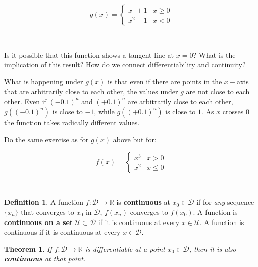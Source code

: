 \documentclass[11pt]{article}
\theoremstyle{definition}
\newtheorem{definition}{Definition}
\theoremstyle{plain}
\newtheorem{theorem}{Theorem}
\begin{document}
\[
g(x) = \begin{cases}
x\phantom{^2}+1 & x \geq 0 \\
x^2-1 & x < 0 
\end{cases}
\]

    \begin{center}
    \end{center}
    { \hspace*{\fill} \\}
    
    Is it possible that this function shows a tangent line at \(x = 0\)?
What is the implication of this result? How do we connect
differentiability and continuity?

What is happening under \(g(x)\) is that even if there are points in the
\(x-\)axis that are arbitrarily close to each other, the values under
\(g\) are not close to each other. Even if \((-0.1)^n\) and \((+0.1)^n\)
are arbitrarily close to each other, \(g\left((-0.1)^n\right)\) is close
to \(-1\), while \(g\left((+0.1)^n\right)\) is close to \(1\). As \(x\)
crosses \(0\) the function takes radically different values.

Do the same exercise as for \(g(x)\) above but for:

\[
f(x) = \begin{cases}
x^3 & x>0 \\
x^2 & x\leq 0
\end{cases}
\]

    \begin{center}
    \end{center}
    { \hspace*{\fill} \\}

\begin{definition}
A function \(f:\mathcal{D}\rightarrow\mathbb{R}\)
is \textbf{continuous} at \(x_0\in\mathcal{D}\) if for \emph{any}
sequence \(\{x_n\}\) that converges to \(x_0\) in \(\mathcal{D}\),
\(f(x_n)\) converges to \(f(x_0)\). A function is \textbf{continuous on
a set} \(\mathcal{U}\subset\mathcal{D}\) if it is continuous at every
\(x\in\mathcal{U}\). A function is continuous if it is continuous at
every \(x\in\mathcal{D}\).
\end{definition}

\begin{theorem}
If \(f : \mathcal{D}\rightarrow\mathbb{R}\) is
differentiable at a point \(x_0\in\mathcal{D}\), then it is also
\textbf{continuous} at that point.
\end{theorem}
\end{document}
